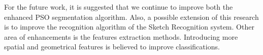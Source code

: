 \documentclass[preprint,1p,times,review]{elsarticle}
\begin{document}
 For the future work, it is suggested that we continue to improve both the
enhanced PSO segmentation algorithm. Also, a possible extension of this research
is to improve the recognition algorithm of the Sketch Recognition system. Other
area of enhancements is the features extraction methods. Introducing more
spatial and geometrical features is believed to improve classifications.

%


\end{document}

